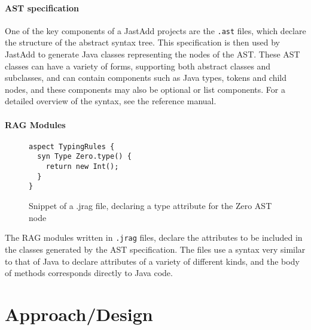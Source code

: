 \documentclass[nofilelist]{cslthse-msc}
\begin{document}
\subsubsection{AST specification}\label{astdef}
One of the key components of a JastAdd projects are the \verb|.ast| files, which declare the structure of the abstract syntax tree.
This specification is then used by JastAdd to generate Java classes representing the nodes of the AST.
These AST classes can have a variety of forms, supporting both abstract classes and subclasses, and can contain components such as Java types, tokens and child nodes, and these components may also be optional or list components.
For a detailed overview of the syntax, see the reference manual\cite{jastaddref}.

\subsubsection{RAG Modules}
\begin{figure}[h]
\begin{lstlisting}[language=jrag]
aspect TypingRules {
  syn Type Zero.type() {
    return new Int();
  }
}
\end{lstlisting}
  \caption{Snippet of a .jrag file, declaring a type attribute for the Zero AST node}
  \label{boolstrgen}
\end{figure}
The RAG modules written in \verb|.jrag| files, declare the attributes to be included in the classes generated by the AST specification.
The files use a syntax very similar to that of Java to declare attributes of a variety of different kinds, and the body of methods corresponds directly to Java code.

\chapter{Approach/Design} %
\end{document}
